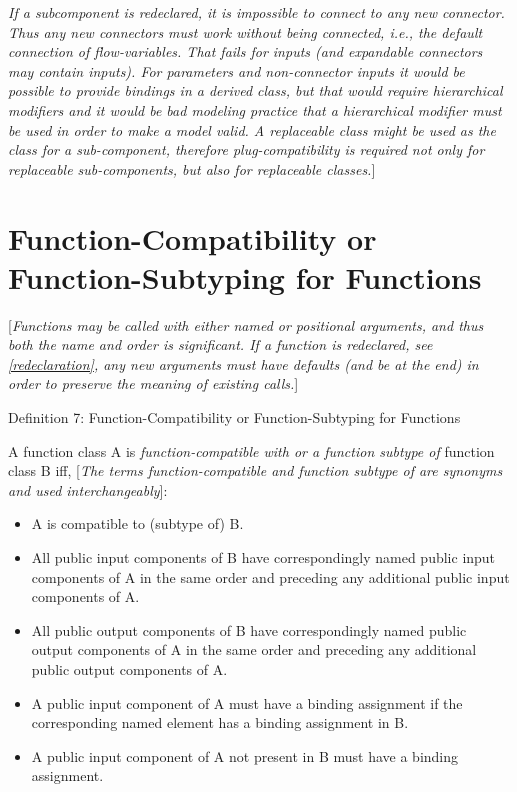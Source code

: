\documentclass[10pt,a4paper]{report}
\def\doublelabel#1{\label{#1}}
\begin{document}
\emph{If a subcomponent is redeclared, it is impossible to connect to
any new connector. Thus any new connectors must work without being
connected, i.e., the default connection of flow-variables. That fails
for inputs (and expandable connectors may contain inputs). For
parameters and non-connector inputs it would be possible to provide
bindings in a derived class, but that would require hierarchical
modifiers and it would be bad modeling practice that a hierarchical
modifier must be used in order to make a model valid. A replaceable
class might be used as the class for a sub-component, therefore
plug-compatibility is required not only for replaceable sub-components,
but also for replaceable classes.}{]}

\section{Function-Compatibility or Function-Subtyping for Functions}\doublelabel{function-compatibility-or-function-subtyping-for-functions}

{[}\emph{Functions may be called with either named or positional
arguments, and thus both the name and order is significant. If a
function is redeclared, see \ref{redeclaration}, any new arguments must
have defaults (and be at the end) in order to preserve the meaning of
existing calls.}{]}

Definition 7: Function-Compatibility or Function-Subtyping for Functions

A function class A is \emph{function-compatible with or a function
subtype of} function class B iff, {[}\emph{The terms function-compatible
and function subtype of are synonyms and used interchangeably}{]}:

\begin{itemize}
\item
  A is compatible to (subtype of) B.
\item
  All public input components of B have correspondingly named public
  input components of A in the same order and preceding any additional
  public input components of A.
\item
  All public output components of B have correspondingly named public
  output components of A in the same order and preceding any additional
  public output components of A.
\item
  A public input component of A must have a binding assignment if the
  corresponding named element has a binding assignment in B.
\item
  A public input component of A not present in B must have a binding
  assignment.
\end{itemize}
\end{document}
